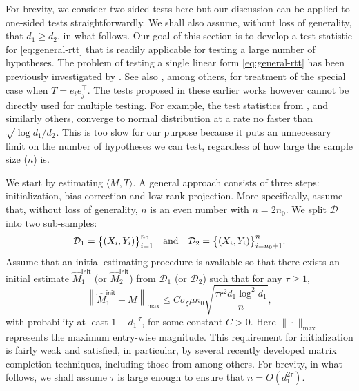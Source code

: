 \documentclass[12pt]{article}
\newcommand{\norm}[1]{\left\lVert#1\right\rVert}
\newcommand{\cD}{\mathcal{D}}
\theoremstyle{plain}
\begin{document}
\begin{sloppypar}
For brevity, we consider two-sided tests here but our discussion can be applied to one-sided tests straightforwardly. We shall also assume, without loss of generality, that $d_1\ge d_2$, in what follows. Our goal of this section is to develop a test statistic for \eqref{eq:general-rtt} that is readily applicable for testing a large number of hypotheses. The problem of testing a single linear form \eqref{eq:general-rtt} has been previously investigated by \cite{xia2021statistical}. See also \cite{chen2019inference,farias2022uncertainty, chen2023statistical}, among others, for treatment of the special case when $T=e_ie_j^\top$. The tests proposed in these earlier works however cannot be directly used for multiple testing. For example, the test statistics from \cite{xia2021statistical}, and similarly others, converge to normal distribution at a rate no faster than $\sqrt{\log d_1/d_2}$. This is too slow for our purpose because it puts an unnecessary limit on the number of hypotheses we can test, regardless of how large the sample size ($n$) is.

We start by estimating $\langle M, T\rangle$. A general approach consists of three steps: initialization, bias-correction and low rank projection. More specifically, assume that, without loss of generality, $n$ is an even number with $n=2n_0$. We split $\cD$ into two sub-samples:
$$
\cD_1=\big\{(X_i, Y_i)\big\}_{i=1}^{n_0}\quad {\rm and}\quad \cD_2=\big\{(X_i, Y_i)\big\}_{i=n_0+1}^{n}.
$$
Assume that an initial estimating procedure is available so that there exists an initial estimate $\widehat{M}_1^{\mathsf{init}}$ (or $\widehat{M}_2^{\mathsf{init}}$) from $\cD_1$ (or $\cD_2$) such that for any $\tau\ge 1$,
\begin{equation}\label{eq:init-est}
	\norm{\widehat{M}_1^{\mathsf{init}} - M}_{\max} \le C  \sigma_\xi \mu \kappa_0 \sqrt{\frac{\tau r^2 d_1 \log ^2 d_1}{n }} ,
\end{equation}
with probability at least $1-d_1^{-\tau}$, for some constant $C>0$. Here $\|\cdot\|_{\max}$ represents the maximum entry-wise magnitude. 
This requirement for initialization is fairly weak and satisfied, in particular, by several recently developed matrix completion techniques, including those from \cite{wei2016guarantees,ma2018implicit,chen2020noisy,xia2021statistical,cai2022generalized} among others. For brevity, in what follows, we shall assume $\tau$ is large enough to ensure that $n=O(d_1^{2\tau})$.


\end{sloppypar}
\end{document}
